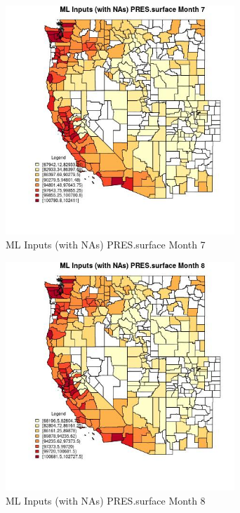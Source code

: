 \begin{figure} 
\centering  
\includegraphics[width=0.77\textwidth]{Code_Outputs/Report_ML_input_PM25_Step4_part_e_de_duplicated_aves_compiled_2019-05-21wNAs_CountyPRESsurfacemedianMonth7.jpg} 
\caption{\label{fig:Report_ML_input_PM25_Step4_part_e_de_duplicated_aves_compiled_2019-05-21wNAsCountyPRESsurfacemedianMonth7}ML Inputs (with NAs) PRES.surface Month 7} 
\end{figure} 
 

\begin{figure} 
\centering  
\includegraphics[width=0.77\textwidth]{Code_Outputs/Report_ML_input_PM25_Step4_part_e_de_duplicated_aves_compiled_2019-05-21wNAs_CountyPRESsurfacemedianMonth8.jpg} 
\caption{\label{fig:Report_ML_input_PM25_Step4_part_e_de_duplicated_aves_compiled_2019-05-21wNAsCountyPRESsurfacemedianMonth8}ML Inputs (with NAs) PRES.surface Month 8} 
\end{figure} 
 

